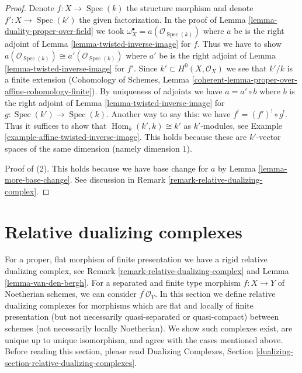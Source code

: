 \documentclass{stacks-project}
\theoremstyle{plain}
\theoremstyle{definition}
\theoremstyle{remark}
\numberwithin{equation}{subsection}
\def\Spec{\mathop{\mathrm{Spec}}}
\def\Hom{\mathop{\mathrm{Hom}}\nolimits}
\begin{document}
\begin{proof}
Denote $f : X \to \Spec(k)$ the structure morphism and denote
$f' : X \to \Spec(k')$ the given factorization.
In the proof of Lemma \ref{lemma-duality-proper-over-field}
we took $\omega_X^\bullet = a(\mathcal{O}_{\Spec(k)})$
where $a$ be is the right adjoint of
Lemma \ref{lemma-twisted-inverse-image} for $f$.
Thus we have to show
$a(\mathcal{O}_{\Spec(k)}) \cong a'(\mathcal{O}_{\Spec(k)})$
where $a'$ be is the right adjoint of
Lemma \ref{lemma-twisted-inverse-image} for $f'$.
Since $k' \subset H^0(X, \mathcal{O}_X)$ we see that $k'/k$ is a finite
extension (Cohomology of Schemes, Lemma
\ref{coherent-lemma-proper-over-affine-cohomology-finite}).
By uniqueness of adjoints we have $a = a' \circ b$ where
$b$ is the right adjoint of Lemma
\ref{lemma-twisted-inverse-image} for $g : \Spec(k') \to \Spec(k)$.
Another way to say this: we have $f^! = (f')^! \circ g^!$.
Thus it suffices to show that $\Hom_k(k', k) \cong k'$ as
$k'$-modules, see Example \ref{example-affine-twisted-inverse-image}.
This holds because these are $k'$-vector spaces of
the same dimension (namely dimension $1$).

\medskip\noindent
Proof of (2). This holds because we have base change for $a$ by
Lemma \ref{lemma-more-base-change}. See discussion in
Remark \ref{remark-relative-dualizing-complex}.
\end{proof}








\section{Relative dualizing complexes}
\label{section-relative-dualizing-complexes}

\noindent
For a proper, flat morphism of finite presentation we have a
rigid relative dualizing complex, see
Remark \ref{remark-relative-dualizing-complex} and
Lemma \ref{lemma-van-den-bergh}. For a separated and finite type
morphism $f : X \to Y$ of Noetherian schemes, we can consider
$f^!\mathcal{O}_Y$. In this section we define relative dualizing complexes
for morphisms which are flat and locally of finite presentation
(but not necessarily quasi-separated or quasi-compact) between
schemes (not necessarily locally Noetherian).
We show such complexes exist, are unique up to unique
isomorphism, and agree with the cases mentioned above.
Before reading this section, please read
Dualizing Complexes, Section
\ref{dualizing-section-relative-dualizing-complexes}.
\end{document}
